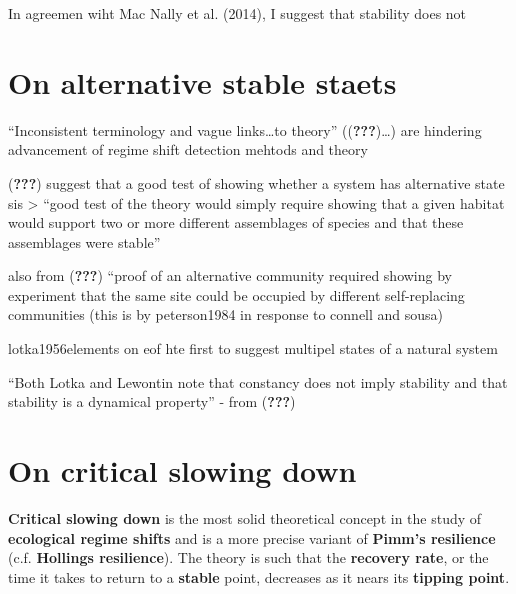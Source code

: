 \documentclass[12pt,twoside,openany]{reedthesis}
\begin{document}
In agreemen wiht Mac Nally et al. (2014), I suggest that stability does
not

\section{On alternative stable
staets}\label{on-alternative-stable-staets}

``Inconsistent terminology and vague links\ldots{}to theory''
(({\textbf{???}})\ldots{}) are hindering advancement of regime shift
detection mehtods and theory

({\textbf{???}}) suggest that a good test of showing whether a system
has alternative state sis \textgreater{} ``good test of the theory would
simply require showing that a given habitat would support two or more
different assemblages of species and that these assemblages were
stable''

also from ({\textbf{???}}) ``proof of an alternative community required
showing by experiment that the same site could be occupied by different
self-replacing communities (this is by peterson1984 in response to
connell and sousa)

lotka1956elements on eof hte first to suggest multipel states of a
natural system

``Both Lotka and Lewontin note that constancy does not imply stability
and that stability is a dynamical property'' - from ({\textbf{???}})

\section{On critical slowing down}\label{on-critical-slowing-down}

\textbf{Critical slowing down} is the most solid theoretical concept in
the study of \textbf{ecological regime shifts} and is a more precise
variant of \textbf{Pimm's resilience} (c.f. \textbf{Hollings
resilience}). The theory is such that the \textbf{recovery rate}, or the
time it takes to return to a \textbf{stable} point, decreases as it
nears its \textbf{tipping point}.
\end{document}
